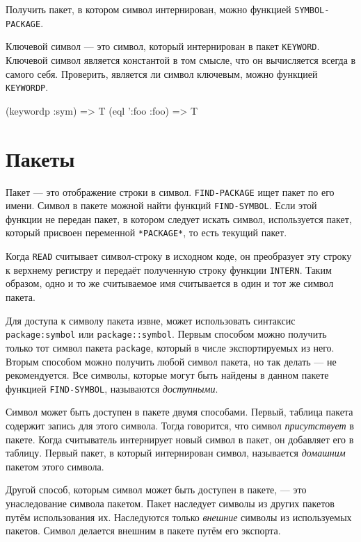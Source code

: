 Получить пакет, в котором символ интернирован, можно функцией \lstinline{SYMBOL-PACKAGE}.

Ключевой символ — это символ, который интернирован в пакет \lstinline{KEYWORD}. Ключевой символ является константой в том смысле, что он вычисляется всегда в самого себя. Проверить, является ли символ ключевым, можно функцией \lstinline{KEYWORDP}.
\begin{cllst}{}{}
(keywordp :sym) => T
(eql ':foo :foo) => T
\end{cllst}

\section{Пакеты}
Пакет — это отображение строки в символ. \lstinline{FIND-PACKAGE} ищет пакет по его имени. Символ в пакете можной найти функций \lstinline{FIND-SYMBOL}.
Если этой функции не передан пакет, в котором следует искать символ, используется пакет, который присвоен переменной \lstinline{*PACKAGE*}, то есть текущий пакет.

Когда \lstinline{READ} считывает символ-строку в исходном коде, он преобразует эту строку к верхнему регистру и передаёт полученную строку функции \lstinline{INTERN}. Таким образом, одно и то же считываемое имя считывается в один и тот же символ пакета.

Для доступа к символу пакета извне, может использовать синтаксис \lstinline{package:symbol} или \lstinline{package::symbol}. Первым способом можно получить только тот символ пакета \lstinline{package}, который в числе экспортируемых из него. Вторым способом можно получить любой символ пакета, но так делать — не рекомендуется. Все символы, которые могут быть найдены в данном пакете функцией \lstinline{FIND-SYMBOL}, называются \emph{доступными}.

Символ может быть доступен в пакете двумя способами. Первый, таблица пакета содержит запись для этого символа. Тогда говорится, что символ \emph{присутствует} в пакете. Когда считыватель интернирует новый символ в пакет, он добавляет его в таблицу. Первый пакет, в который интернирован символ, называется \emph{домашним} пакетом этого символа.

Другой способ, которым символ может быть доступен в пакете, — это унаследование символа пакетом. Пакет наследует символы из других пакетов путём использования их. Наследуются только \emph{внешние} символы из используемых пакетов. Символ делается внешним в пакете путём его экспорта.

